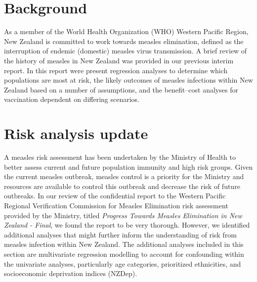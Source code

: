 \documentclass{article}
\begin{document}
\section{Background}

As a member of the World Health Organization (WHO) Western Pacific Region, New Zealand is committed to work towards measles elimination, defined as the interruption of endemic (domestic) measles virus transmission. A brief review of the history of measles in New Zealand was provided in our previous interim report. In this report were present regression analyses to determine which populations are most at risk, the likely outcomes of measles infections within New Zealand based on a number of assumptions, and the benefit--cost analyses for vaccination dependent on differing scenarios. 

\section{Risk analysis update}
\label{sub:risk_analyses}

A measles risk assessment has been undertaken by the Ministry of Health to better assess current and future population immunity and high risk groups. Given the current measles outbreak, measles control is a priority for the Ministry and resources are available to control this outbreak and decrease the risk of future outbreaks. In our review of the confidential report to the Western Pacific Regional Verification Commission for Measles Elimination risk assessment provided by the Ministry, titled \emph {Progress Towards Measles Elimination in New Zealand - Final}, we found the report to be very thorough. However, we identified additional analyses that might further inform the understanding of risk from measles infection within New Zealand. The additional analyses included in this section are multivariate regression modelling to account for confounding within the univariate analyses, particularly age categories, prioritized ethnicities, and socioeconomic deprivation indices (NZDep).
\end{document}
